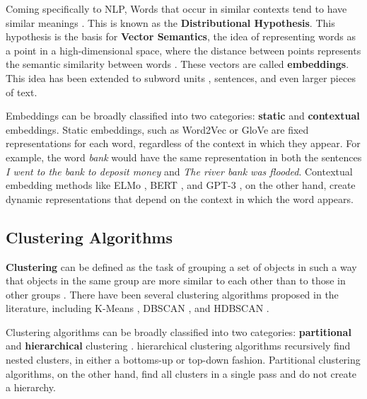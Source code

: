 Coming specifically to NLP, Words that occur in similar contexts tend to have similar meanings \cite{harrisDistributionalStructure1954}. This is 
known as the \textbf{Distributional Hypothesis}. This hypothesis is the basis for \textbf{Vector Semantics}, the idea of representing words as a point
in a high-dimensional space, where the distance between points represents the semantic similarity between words \cite{jm3}. These vectors are called 
\textbf{embeddings}. This idea has been extended to subword units \cite{wuGooglesNeuralMachine2016}, sentences, and even larger pieces of text.

Embeddings can be broadly classified into two categories: \textbf{static} and \textbf{contextual} embeddings. Static embeddings, such as 
Word2Vec \cite{mikolovDistributedRepresentationsWords2013} or GloVe \cite{penningtonGloVeGlobalVectors2014} are fixed representations
for each word, regardless of the context in which they appear. For example, the word \textit{bank} would have the same representation in both the sentences
\textit{I went to the bank to deposit money} and \textit{The river bank was flooded}. Contextual embedding methods like ELMo \cite{petersDeepContextualizedWord2018}, BERT \cite{devlinBERTPretrainingDeep2019}, 
and GPT-3 \cite{brownLanguageModelsAre2020}, on the other hand, create dynamic representations that depend on the context in which the word appears.



\subsection{Clustering Algorithms}
\textbf{Clustering} can be defined as the task of grouping a set of objects in such a way that objects in the same group are more similar to 
each other than to those in other groups \cite{jainDataClustering502010}. There have been several clustering algorithms proposed in the literature,
including K-Means \cite{lloydLeastSquaresQuantization1982}, DBSCAN \cite{esterDensitybasedAlgorithmDiscovering1996}, and HDBSCAN \cite{campelloDensityBasedClusteringBased2013}.

Clustering algorithms can be broadly classified into two categories: \textbf{partitional} and \textbf{hierarchical} clustering \cite{jainDataClustering502010}. 
hierarchical clustering algorithms recursively find nested clusters, in either a bottoms-up or top-down fashion. Partitional clustering algorithms, on the other hand,
find all clusters in a single pass and do not create a hierarchy.

